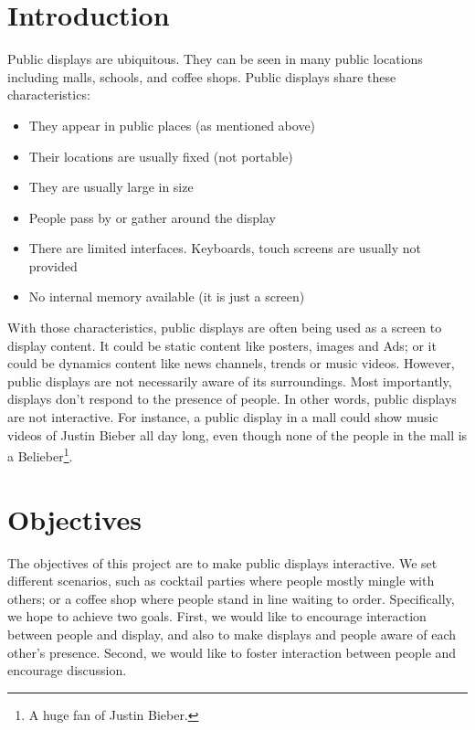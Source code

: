 \documentclass{sig-alternate}
\begin{document}

\maketitle
{}

\section{Introduction}
Public displays are ubiquitous. They can be seen in many public locations including malls, schools, and coffee shops. Public displays share these characteristics:
\begin{itemize}
	\item They appear in public places (as mentioned above)
	\item Their locations are usually fixed (not portable)
	\item They are usually large in size
	\item People pass by or gather around the display
	\item There are limited interfaces. Keyboards, touch screens are usually not provided
	\item No internal memory available (it is just a screen)
\end{itemize}

With those characteristics, public displays are often being used as a screen to display content. It could be static content like posters, images and Ads; or it could be dynamics content like news channels, trends or music videos. However, public displays are not necessarily aware of its surroundings. Most importantly, displays don't respond to the presence of people. In other words, public displays are not interactive. For instance, a public display in a mall could show music videos of Justin Bieber all day long, even though none of the people in the mall is a Belieber\footnote{A huge fan of Justin Bieber.}.

\section{Objectives}
The objectives of this project are to make public displays interactive. We set different 
scenarios, such as cocktail parties where people mostly mingle with others; or a coffee 
shop where people stand in line waiting to order. Specifically, we hope to achieve two 
goals. First, we would like to encourage interaction between people and display, and 
also to make displays and people aware of each other's presence. Second, we would 
like to foster interaction between people and encourage discussion.
\end{document}
